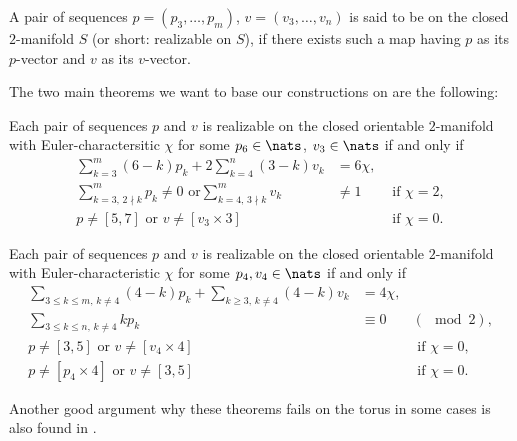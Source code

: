 \begin{definition}\label{def:realizable}
  A pair of sequences $p = (p_3, \dots, p_m)$, $v = (v_3, \dots, v_n)$ is said to be  on the closed $2$-manifold $S$ (or short: realizable on $S$), if there exists such a map having $p$ as its $p$-vector and $v$ as its $v$-vector.
\end{definition}

The two main theorems we want to base our constructions on are the following:

\begin{theorem} \label{thm:eberhard:extended:3}
  Each pair of sequences $p$ and $v$ is realizable on the closed orientable $2$-manifold with {\sc Euler}-charactersitic $\chi$ for some $p_6 \in \nats$, $v_3 \in \nats$ if and only if
  \begin{align*}
    \sum_{k=3}^m (6-k)p_k + 2 \sum_{k=4}^n (3-k)v_k &= 6\chi, \\
    \sum_{k=3,\, 2 \nmid k}^{m} p_k \neq 0 \text{ or} \sum_{k=4, \,3 \nmid k}^m v_k &\neq 1 &\text{ if } \chi = 2, \\
    p \neq [5, 7] \text{ or } v \neq [v_3 \times 3]  &&\text{ if } \chi = 0.
  \end{align*}
\end{theorem}

\begin{theorem} \label{thm:eberhard:extended:4}
  Each pair of sequences $p$ and $v$ is realizable on the closed orientable $2$-manifold with {\sc Euler}-characteristic $\chi$ for some $p_4, v_4 \in \nats$ if and only if
  \begin{align*}
    \sum_{3 \leq k \leq m,\, k \neq 4} (4-k)p_k + \sum_{k \geq 3,\, k\neq 4} (4-k)v_k &= 4\chi, \\
    \sum_{3 \leq k \leq n,\, k \neq 4} k p_k &\equiv 0& (\mod 2), \\
    p \neq [3, 5] \text{ or } v \neq [v_4 \times 4] &&\text{ if } \chi = 0,\\
    p \neq [p_4 \times 4] \text{ or } v \neq [3, 5] &&\text{ if } \chi = 0.
  \end{align*}
\end{theorem}

Another good argument why these theorems fails on the torus in some cases is also found in \cite{izmestiev2013there}.